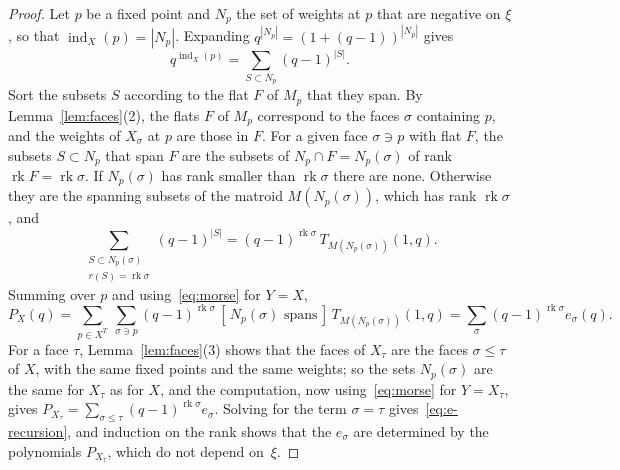 \documentclass[11pt,a4paper]{article}
\numberwithin{equation}{section}
\theoremstyle{plain}
\theoremstyle{definition}
\theoremstyle{remark}
\DeclareMathOperator{\rk}{rk}
\DeclareMathOperator{\ind}{ind}
\begin{document}
\begin{proof}
Let $p$ be a fixed point and $N_p$ the set of weights at $p$ that are negative on $\xi$, so that $\ind_X(p)=|N_p|$. Expanding $q^{|N_p|}=(1+(q-1))^{|N_p|}$ gives
\[
q^{\ind_X(p)}=\sum_{S\subset N_p}(q-1)^{|S|}.
\]
Sort the subsets $S$ according to the flat $F$ of $M_p$ that they span. By Lemma~\ref{lem:faces}(2), the flats $F$ of $M_p$ correspond to the faces $\sigma$ containing $p$, and the weights of $X_\sigma$ at $p$ are those in $F$. For a given face $\sigma\ni p$ with flat $F$, the subsets $S\subset N_p$ that span $F$ are the subsets of $N_p\cap F=N_p(\sigma)$ of rank $\rk F=\rk\sigma$. If $N_p(\sigma)$ has rank smaller than $\rk\sigma$ there are none. Otherwise they are the spanning subsets of the matroid $M(N_p(\sigma))$, which has rank $\rk\sigma$, and
\[
\sum_{\substack{S\subset N_p(\sigma)\\ r(S)=\rk\sigma}}(q-1)^{|S|}=(q-1)^{\rk\sigma}\,T_{M(N_p(\sigma))}(1,q).
\]
Summing over $p$ and using~\eqref{eq:morse} for $Y=X$,
\[
P_X(q)=\sum_{p\in X^T}\ \sum_{\sigma\ni p}(q-1)^{\rk\sigma}\,[\,N_p(\sigma)\text{ spans}\,]\,T_{M(N_p(\sigma))}(1,q)=\sum_\sigma(q-1)^{\rk\sigma}e_\sigma(q).
\]
For a face $\tau$, Lemma~\ref{lem:faces}(3) shows that the faces of $X_\tau$ are the faces $\sigma\leqslant\tau$ of $X$, with the same fixed points and the same weights; so the sets $N_p(\sigma)$ are the same for $X_\tau$ as for $X$, and the computation, now using~\eqref{eq:morse} for $Y=X_\tau$, gives $P_{X_\tau}=\sum_{\sigma\leqslant\tau}(q-1)^{\rk\sigma}e_\sigma$. Solving for the term $\sigma=\tau$ gives~\eqref{eq:e-recursion}, and induction on the rank shows that the $e_\sigma$ are determined by the polynomials $P_{X_\tau}$, which do not depend on~$\xi$.
\end{proof}
\end{document}
